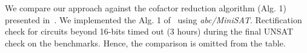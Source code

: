 We compare our approach against the cofactor reduction algorithm (Alg. 1) presented in~\cite{MF_Huang:DATE12}.
We implemented the Alg. 1 of~\cite{MF_Huang:DATE12} using {\it abc/MiniSAT}. 
Rectification check for circuits beyond 16-bits timed out (3 hours) during the final UNSAT check 
on the benchmarks.  
Hence, the comparison is omitted from the table. 
